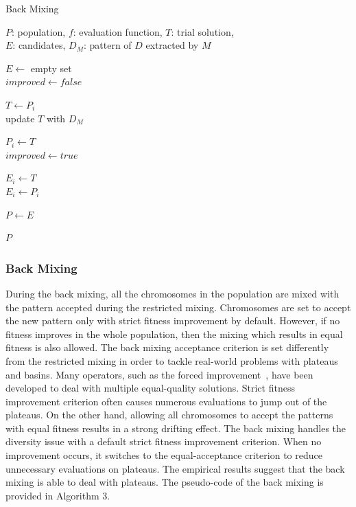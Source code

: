 \begin{algorithm}[t!]
\caption{Back Mixing}\label{algo_disjdecomp}

$P$: population, $f$: evaluation function, $T$: trial solution, \\
$E$: candidates, ${D_M}$: pattern of $D$ extracted by $M$ \\

\BlankLine
{}


\BlankLine
$E \leftarrow$ empty set \\
$improved  \leftarrow false$ \\

\BlankLine
{} {

    $T \leftarrow P_i$ \\
    update $T$ with ${D_M}$ \\

     {

        $P_i \leftarrow T$ \\
        $improved  \leftarrow true$ \\
    }{
         {
            $E_i \leftarrow T$ \\
        }{
			  $E_i \leftarrow P_i$ \\
        }
    }
}
 {
    $P \leftarrow E$ \\
} 

\Return $P$

\end{algorithm} 

\subsubsection{Back Mixing}

During the back mixing, all the chromosomes in the population are mixed with the pattern accepted during the restricted mixing. Chromosomes are set to accept the new pattern only with strict fitness improvement by default. However, if no fitness improves in the whole population, then the mixing which results in equal fitness is also allowed. The back mixing acceptance criterion is set differently from the restricted mixing in order to tackle real-world problems with plateaus and basins. Many operators, such as the forced improvement~\cite{bosman:LT-GOMEA}, have been developed to deal with multiple equal-quality solutions. Strict fitness improvement criterion often causes numerous evaluations to jump out of the plateaus. On the other hand, allowing all chromosomes to accept the patterns with equal fitness results in a strong drifting effect. The back mixing handles the diversity issue with a default strict fitness improvement criterion. When no improvement occurs, it switches to the equal-acceptance criterion to reduce unnecessary evaluations on plateaus. The empirical results suggest that the back mixing is able to deal with plateaus. The pseudo-code of the back mixing is provided in Algorithm 3. 



